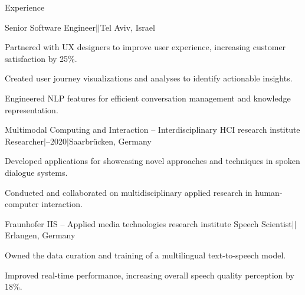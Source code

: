 \documentclass{resume} %
\begin{document}
\begin{rSection}{Experience}
\begin{rSubsection}
\end{rSubsection}
\vspace*{-0.3cm}
\begin{rSubsection}
	{}
	{}
	{Senior Software Engineer\quad$\vert$\quad$\vert$\quad Tel Aviv, Israel}
	{}
	
	\setlength{\itemindent}{.5cm}
	
	\item Partnered with UX designers to improve user experience, increasing customer satisfaction by 25\%.
	\item Created user journey visualizations and analyses to identify actionable insights.
	\item Engineered NLP features for efficient conversation management and knowledge representation.
	
\end{rSubsection}

\begin{rSubsection}
	{Multimodal Computing and Interaction -- {\small Interdisciplinary HCI research institute}}
	{}
	{Researcher\quad$\vert$--2020\quad$\vert$\quad Saarbrücken, Germany}
	{}
	
	\setlength{\itemindent}{.5cm}
	
	\item Developed applications for showcasing novel approaches and techniques in spoken dialogue systems.
	\item Conducted and collaborated on multidisciplinary applied research in human-computer interaction.
\end{rSubsection}

\begin{rSubsection}
	{Fraunhofer IIS -- {\small Applied media technologies research institute}}
	{}
	{Speech Scientist\quad$\vert$\quad$\vert$\quad Erlangen, Germany}
	{}
	
	\setlength{\itemindent}{.5cm}
	
	\item Owned the data curation and training of a multilingual text-to-speech model.
	\item Improved real-time performance, increasing overall speech quality perception by 18\%.
\end{rSubsection}


\end{rSection}
\end{document}

